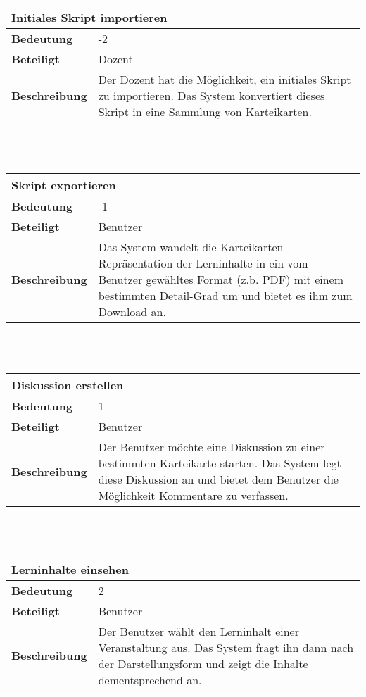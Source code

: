 \documentclass[12pt,a4paper]{article}
\begin{document}
\begin{tabular}{l p{10cm}}
\multicolumn{2}{l}{\textbf{Initiales Skript importieren}} \\ \hline
\textbf{Bedeutung} & -2 \\ \hline 
\textbf{Beteiligt} & Dozent \\ \hline 
\textbf{Beschreibung} & Der Dozent hat die Möglichkeit, ein initiales Skript zu importieren. Das System konvertiert dieses Skript in eine Sammlung von Karteikarten. \\ 
\hline 
\end{tabular}\\\\

\begin{tabular}{l p{10cm}}
\multicolumn{2}{l}{\textbf{Skript exportieren}} \\ \hline
\textbf{Bedeutung} & -1 \\ \hline 
\textbf{Beteiligt} & Benutzer \\ \hline 
\textbf{Beschreibung} & Das System wandelt die Karteikarten-Repräsentation der Lerninhalte in ein vom Benutzer gewähltes Format (z.b. PDF) mit einem bestimmten Detail-Grad um und bietet es ihm zum Download an. \\ 
\hline 
\end{tabular}\\\\

\begin{tabular}{l p{10cm}}
\multicolumn{2}{l}{\textbf{Diskussion erstellen}} \\ \hline
\textbf{Bedeutung} & 1 \\ \hline 
\textbf{Beteiligt} & Benutzer \\ \hline 
\textbf{Beschreibung} & Der Benutzer möchte eine Diskussion zu einer bestimmten Karteikarte starten. Das System legt diese Diskussion an und bietet dem Benutzer die Möglichkeit Kommentare zu verfassen. \\ 
\hline 
\end{tabular}\\\\

\begin{tabular}{l p{10cm}}
\multicolumn{2}{l}{\textbf{Lerninhalte einsehen}} \\ \hline
\textbf{Bedeutung} & 2 \\ \hline 
\textbf{Beteiligt} & Benutzer \\ \hline 
\textbf{Beschreibung} & Der Benutzer wählt den Lerninhalt einer Veranstaltung aus. Das System fragt ihn dann nach der Darstellungsform und zeigt die Inhalte dementsprechend an. \\ 
\hline 
\end{tabular}\\\\
\end{document}
